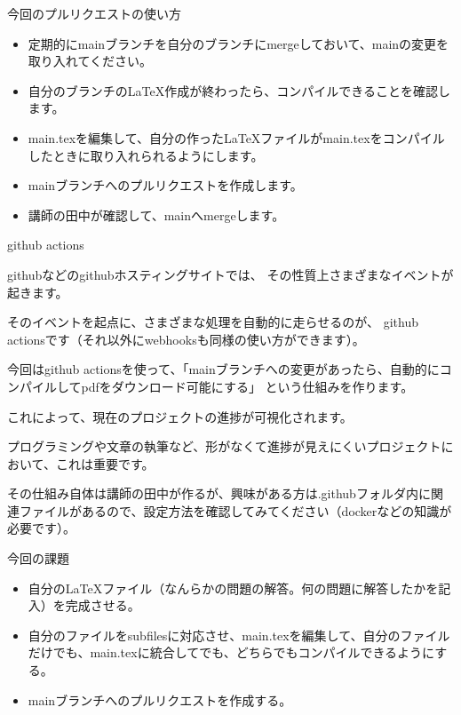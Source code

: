\documentclass[12pt, unicode]{beamer}
\begin{document}
\begin{frame}{今回のプルリクエストの使い方}

\begin{itemize}
\item 定期的にmainブランチを自分のブランチにmergeしておいて、mainの変更を取り入れてください。
\item 自分のブランチのLaTeX作成が終わったら、コンパイルできることを確認します。
\item main.texを編集して、自分の作ったLaTeXファイルがmain.texをコンパイルしたときに取り入れられるようにします。
\item mainブランチへのプルリクエストを作成します。
\item 講師の田中が確認して、mainへmergeします。
\end{itemize}

\end{frame}
\begin{frame}{github actions}

githubなどのgithubホスティングサイトでは、
その性質上さまざまなイベントが起きます。

そのイベントを起点に、さまざまな処理を自動的に走らせるのが、
github actionsです（それ以外にwebhooksも同様の使い方ができます）。

今回はgithub actionsを使って、「mainブランチへの変更があったら、自動的にコンパイルしてpdfをダウンロード可能にする」
という仕組みを作ります。

これによって、現在のプロジェクトの進捗が可視化されます。

プログラミングや文章の執筆など、形がなくて進捗が見えにくいプロジェクトにおいて、これは重要です。

その仕組み自体は講師の田中が作るが、興味がある方は.githubフォルダ内に関連ファイルがあるので、設定方法を確認してみてください（dockerなどの知識が必要です）。

\end{frame}

\begin{frame}{今回の課題}

\begin{itemize}
\item 自分の\LaTeX ファイル（なんらかの問題の解答。何の問題に解答したかを記入）を完成させる。
\item 自分のファイルをsubfilesに対応させ、main.texを編集して、自分のファイルだけでも、main.texに統合してでも、どちらでもコンパイルできるようにする。
\item mainブランチへのプルリクエストを作成する。
\end{itemize}
\end{frame}
\end{document}
